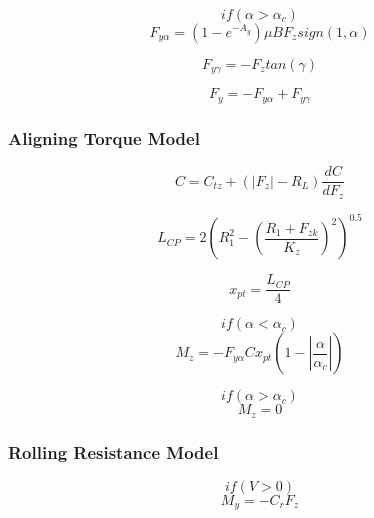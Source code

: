 \begin{displaymath}if( \alpha > \alpha_{c})\end{displaymath}
\begin{displaymath}
F_{y\alpha} = (1-e^{-A_{y}})\mu BF_{z} sign(1,\alpha) 
\end{displaymath}

\begin{displaymath}
F_{y\gamma}=-F_{z}tan(\gamma)
\end{displaymath}

\begin{displaymath}
F_{y}=-F_{y\alpha}+F_{y\gamma}
\end{displaymath}

\subsubsection*{Aligning Torque Model}

\begin{displaymath}
C=C_{tz}+(|F_{z}|-R_{L})\frac{dC}{dF_{z}}
\end{displaymath}

\begin{displaymath}
L_{CP}=2(R_{1}^{2}-(\frac{R_{1}+F_{zk}}{K_{z}})^{2})^{0.5}
\end{displaymath}

\begin{displaymath}
x_{pt}=\frac{L_{CP}}{4}
\end{displaymath}

\begin{displaymath}if( \alpha < \alpha_{c})\end{displaymath}
\begin{displaymath}
M_{z}=-F_{y\alpha}Cx_{pt}(1-|\frac{\alpha}{\alpha_{c}}|)
\end{displaymath}

\begin{displaymath}if( \alpha > \alpha_{c})\end{displaymath}
\begin{displaymath}
M_{z}=0
\end{displaymath}

\subsubsection*{Rolling Resistance Model}

\begin{displaymath}if( V > 0)\end{displaymath}
\begin{displaymath}
M_{y}=-C_{r}F_{z}
\end{displaymath}

